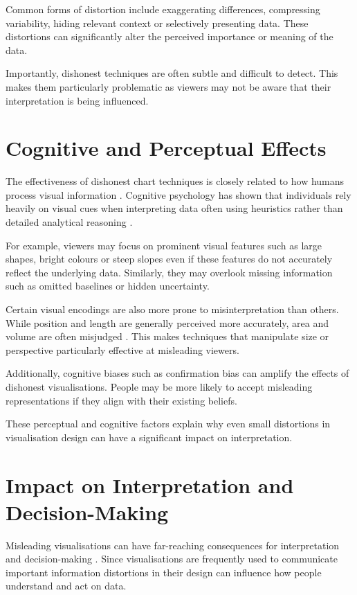 Common forms of distortion include exaggerating differences, compressing variability, hiding relevant context or selectively presenting data. These distortions can significantly alter the perceived importance or meaning of the data.

Importantly, dishonest techniques are often subtle and difficult to detect. This makes them particularly problematic as viewers may not be aware that their interpretation is being influenced.

\section{Cognitive and Perceptual Effects}

The effectiveness of dishonest chart techniques is closely related to how humans process visual information \cite{cleveland1984}. Cognitive psychology has shown that individuals rely heavily on visual cues when interpreting data often using heuristics rather than detailed analytical reasoning  \cite{kahneman2011}.

For example, viewers may focus on prominent visual features such as large shapes, bright colours or steep slopes even if these features do not accurately reflect the underlying data. Similarly, they may overlook missing information such as omitted baselines or hidden uncertainty.

Certain visual encodings are also more prone to misinterpretation than others. While position and length are generally perceived more accurately, area and volume are often misjudged \cite{cleveland1984}. This makes techniques that manipulate size or perspective particularly effective at misleading viewers.

Additionally, cognitive biases such as confirmation bias can amplify the effects of dishonest visualisations. People may be more likely to accept misleading representations if they align with their existing beliefs.

These perceptual and cognitive factors explain why even small distortions in visualisation design can have a significant impact on interpretation.

\section{Impact on Interpretation and Decision-Making}

Misleading visualisations can have far-reaching consequences for interpretation and decision-making \cite{cairo2019}. Since visualisations are frequently used to communicate important information distortions in their design can influence how people understand and act on data.

